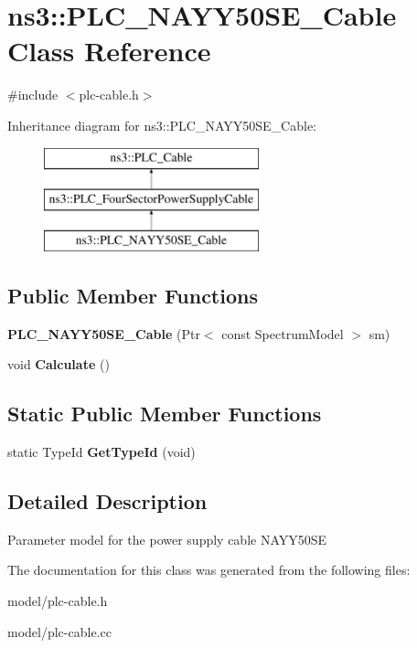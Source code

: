 \hypertarget{classns3_1_1PLC__NAYY50SE__Cable}{\section{ns3\-:\-:\-P\-L\-C\-\_\-\-N\-A\-Y\-Y50\-S\-E\-\_\-\-Cable \-Class \-Reference}
\label{classns3_1_1PLC__NAYY50SE__Cable}
}


{\ttfamily \#include $<$plc-\/cable.\-h$>$}

\-Inheritance diagram for ns3\-:\-:\-P\-L\-C\-\_\-\-N\-A\-Y\-Y50\-S\-E\-\_\-\-Cable\-:\begin{figure}[H]
\begin{center}
\leavevmode
\includegraphics[height=3.000000cm]{classns3_1_1PLC__NAYY50SE__Cable}
\end{center}
\end{figure}
\subsection*{\-Public \-Member \-Functions}
\begin{DoxyCompactItemize}
\item 
\hypertarget{classns3_1_1PLC__NAYY50SE__Cable_a00c27114314fb3c45618d08fdf96ea0e}{{\bfseries \-P\-L\-C\-\_\-\-N\-A\-Y\-Y50\-S\-E\-\_\-\-Cable} (\-Ptr$<$ const \-Spectrum\-Model $>$ sm)}\label{classns3_1_1PLC__NAYY50SE__Cable_a00c27114314fb3c45618d08fdf96ea0e}

\item 
\hypertarget{classns3_1_1PLC__NAYY50SE__Cable_acbb0079a0edd3011b67887d1952d91d8}{void {\bfseries \-Calculate} ()}\label{classns3_1_1PLC__NAYY50SE__Cable_acbb0079a0edd3011b67887d1952d91d8}

\end{DoxyCompactItemize}
\subsection*{\-Static \-Public \-Member \-Functions}
\begin{DoxyCompactItemize}
\item 
\hypertarget{classns3_1_1PLC__NAYY50SE__Cable_ab8e35f2257eaa44fa413b4260f86a9a3}{static \-Type\-Id {\bfseries \-Get\-Type\-Id} (void)}\label{classns3_1_1PLC__NAYY50SE__Cable_ab8e35f2257eaa44fa413b4260f86a9a3}

\end{DoxyCompactItemize}


\subsection{\-Detailed \-Description}
\-Parameter model for the power supply cable \-N\-A\-Y\-Y50\-S\-E 

\-The documentation for this class was generated from the following files\-:\begin{DoxyCompactItemize}
\item 
model/plc-\/cable.\-h\item 
model/plc-\/cable.\-cc\end{DoxyCompactItemize}
